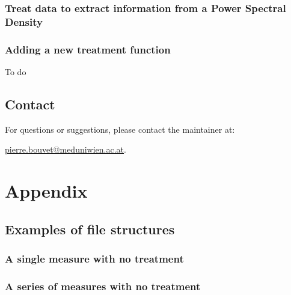 \documentclass{book}
\begin{document}
        \section{Treat data to extract information from a Power Spectral Density} \label{subsec:treatment.toInfo}
            

        \section{Adding a new treatment function} \label{subsec:treatment.new}
            \begin{tcolorbox}
                To do
            \end{tcolorbox}


    \chapter*{Contact}
        For questions or suggestions, please contact the maintainer at:
        \begin{center}
            \href{mailto:pierre.bouvet@meduniwien.ac.at}{pierre.bouvet@meduniwien.ac.at}.
        \end{center}




\appendix

\part*{Appendix}

\chapter{Examples of file structures} \label{chap:examples_file_structures}
    \section{A single measure with no treatment}
        
    
    \section{A series of measures with no treatment}
        
    
\end{document}
